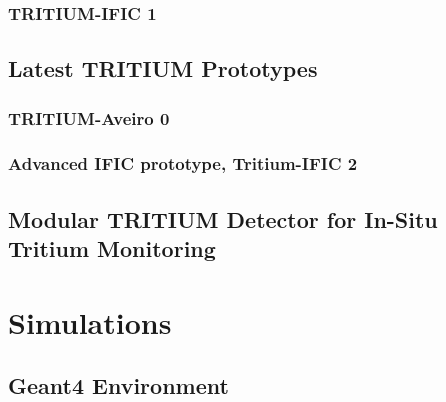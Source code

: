 \documentclass[12pt,a4paper]{book}
\begin{document}
		\subsection{TRITIUM-IFIC 1}\label{subsec:TritiumIFIC1}
		
				
	\section{Latest TRITIUM Prototypes}\label{sec:LatestTritiumPrototypes}
	
	
		\subsection{TRITIUM-Aveiro 0}\label{subsec:TritiumAveiro}
		
		
		\subsection[TRITIUM-IFIC 2]{Advanced IFIC prototype, Tritium-IFIC 2}\label{subsec:TritiumIFIC2}
		
		
	\section[Modular TRITIUM Detector]{Modular TRITIUM Detector for In-Situ Tritium Monitoring}\label{sec:TritiumMonitor}
	
	\newpage

\chapter{Simulations}  \label{chap:Simulations}
	
	
	\section{Geant4 Environment}\label{sec:Geant4Environment}
	
	
\end{document}
